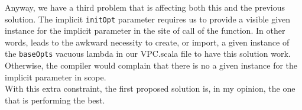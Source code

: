 Anyway, we have a third problem that is affecting both this and the previous solution.
The implicit \texttt{initOpt} parameter requires us to provide a visible given instance for the implicit parameter in the site of call of the function.
In other words, leads to the awkward necessity to create, or import, a given instance of the \texttt{baseOpts} vacuous lambda in our VPC.scala file to have this solution work. 
Otherwise, the compiler would complain that there is no a given instance for the implicit parameter in scope.\\
With this extra constraint, the first proposed solution is, in my opinion, the one that is performing the best.
%

